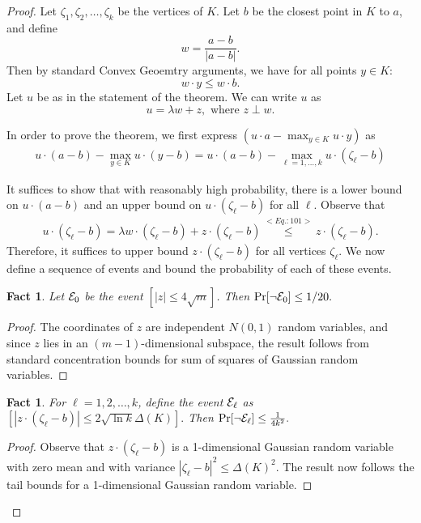 \documentclass[11pt,letterpaper]{article}
\def\eqref#1{<Eq.:#1>}%
\newtheorem{fact}[theorem]{Fact}
\theoremstyle{definition}
\theoremstyle{remark}
\newcommand{\cE}{{\cal E}}
\newcommand{\dia}{\Delta}
\begin{document}
\begin{proof}
 Let $\zeta_1,\zeta_2,\ldots ,\zeta_k$ be the vertices of $K$. Let $b$ be the closest point in $K$ to $a$, and define 
$$w=\frac{a-b}{|a-b|}.$$
Then by standard Convex Geoemtry arguments, we have for all points $y \in K$:
\begin{equation}\label{101}
w\cdot y\leq w\cdot b.
\end{equation}
Let $u$ be as in the statement of the theorem. 
We can write $u$ as 
$$u=\lambda w+z, \mbox{ where }z\perp w.$$

In order to prove the theorem, we first express $(u \cdot a  - \max_{y \in K} u \cdot y)$ as 
\begin{align}
\label{eq:step1}
u \cdot (a-b) - \max_{y \in K} u \cdot (y-b)  =  u \cdot (a-b) - \max_{\ell = 1, \ldots, k} u \cdot (\zeta_\ell-b)
\end{align}

It suffices to show that with reasonably high probability, there is a lower bound on $u \cdot (a-b)$ and an upper bound on $u \cdot (\zeta_\ell-b)$ for all $\ell$. Observe that 
\begin{align}
\label{eq:step2}
u \cdot (\zeta_\ell-b) = \lambda w \cdot (\zeta_\ell-b) + z \cdot (\zeta_\ell-b) \stackrel{\eqref{101}}{\leq} z \cdot (\zeta_\ell-b).
\end{align}
Therefore, it suffices to upper bound $z \cdot (\zeta_\ell - b)$ for all vertices $\zeta_\ell$. We now define a sequence of events and bound the probability of each of these events. 

\begin{fact}
\label{fact:1}
Let $\cE_0$ be the event $[|z| \leq 4 \sqrt{m}]$. Then $\Pr[\neg \cE_0] \leq 1/20. $
\end{fact}
\begin{proof}
The coordinates of $z$ are independent $N(0,1)$ random variables, and since $z$ lies in an $(m-1)$-dimensional subspace, the result follows from standard concentration bounds for sum of squares of Gaussian random variables. 
\end{proof}

\begin{fact}
\label{fact:2}
For $\ell=1,2,\ldots , k$, define the  event
${\cal E}_\ell$ as $[\left| z\cdot (\zeta_\ell-b)\right|\leq 2\sqrt{\ln k} \dia(K)].$ Then $\Pr[\neg \cE_\ell] \leq \frac{1}{4k^2}.$
\end{fact}
\begin{proof}
Observe that $z \cdot (\zeta_\ell - b)$ is a 1-dimensional Gaussian random variable with zero mean and  with variance $|\zeta_\ell - b|^2 \leq \dia(K)^2$. The result now follows the tail bounds for a 1-dimensional Gaussian random variable. 
\end{proof}


\end{proof}
\end{document}
